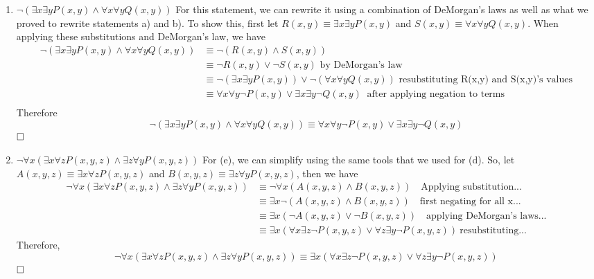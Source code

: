 \documentclass{article}
\begin{document}
\begin{enumerate}[label=(\alph*)]
    \item $\neg (\exists x \exists y P(x,y) \land \forall x \forall y Q(x,y))$
    \smallbreak
    For this statement, we can rewrite it using a combination of DeMorgan's laws as well as what we proved to rewrite statements a) and b). To show this, first let $R(x,y) \equiv \exists x \exists y P(x,y)$ and $S(x,y) \equiv \forall x \forall y Q(x,y)$. When applying these substitutions and DeMorgan's law, we have
    \begin{align*}
        \neg (\exists x \exists y P(x,y) \land \forall x \forall y Q(x,y)) &\equiv  \neg(R(x,y) \land S(x,y)) \\
        &\equiv \neg R(x,y) \lor \neg S(x,y) \text{   by DeMorgan's law} \\
        &\equiv \neg (\exists x \exists y P(x,y)) \lor \neg (\forall x \forall y Q(x,y)) \text{   resubstituting R(x,y) and S(x,y)'s values} \\
        &\equiv \forall x \forall y \neg P(x,y) \lor \exists x \exists y \neg Q(x,y)\ \text{    after applying negation to terms} \\
    \end{align*}
    Therefore
    \[ \neg (\exists x \exists y P(x,y) \land \forall x \forall y Q(x,y)) \equiv \forall x \forall y \neg P(x,y) \lor \exists x \exists y \neg Q(x,y)\]
    $\hfill \square$

    \item $\neg \forall x (\exists x \forall z P(x,y,z) \land \exists z \forall y P(x,y,z))$
    \smallbreak
    For (e), we can simplify using the same tools that we used for (d). So, let $A(x,y,z) \equiv \exists x \forall z P(x,y,z)$ and $B(x,y,z) \equiv \exists z \forall y P(x,y,z)$, then we have
    \begin{align*}
       \neg \forall x (\exists x \forall z P(x,y,z) \land \exists z \forall y P(x,y,z)) &\equiv \neg \forall x (A(x,y,z) \land B(x,y,z)) \quad \text{Applying substitution...} \\
       &\equiv \exists x \neg (A(x,y,z) \land B(x,y,z)) \quad \text{first negating for all x...} \\
       &\equiv \exists x (\neg A(x,y,z) \lor \neg B(x,y,z)) \quad \text{applying DeMorgan's laws...} \\
       &\equiv \exists x (\forall x \exists z \neg P(x,y,z) \lor \forall z \exists y \neg P(x,y,z))\ \text{resubstituting...}
    \end{align*}
    Therefore,
    \[\neg \forall x (\exists x \forall z P(x,y,z) \land \exists z \forall y P(x,y,z))\equiv \exists x (\forall x \exists z \neg P(x,y,z) \lor \forall z \exists y \neg P(x,y,z))\]
    $\hfill \square$

\end{enumerate}
\end{document}
